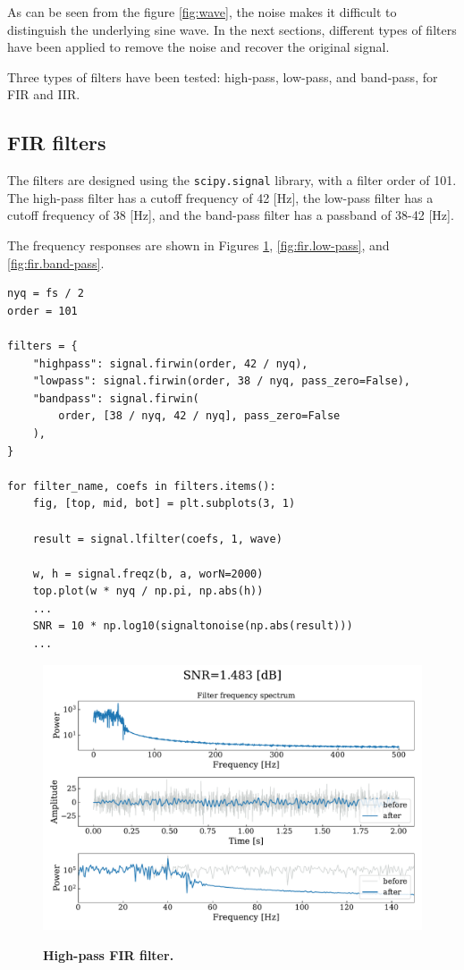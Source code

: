 \documentclass[13pt,a4paper]{article}
\begin{document}
As can be seen from the figure \ref{fig:wave}, the noise makes it difficult to distinguish the underlying sine wave. In the next sections, different types of filters have been applied to remove the noise and recover the original signal.

Three types of filters have been tested: high-pass, low-pass, and band-pass, for FIR and IIR.

\subsection{FIR filters}

The filters are designed using the \verb|scipy.signal| library, with a filter order of 101. The high-pass filter has a cutoff frequency of 42 [Hz], the low-pass filter has a cutoff frequency of 38 [Hz], and the band-pass filter has a passband of 38-42 [Hz].

The frequency responses are shown in Figures \ref{fig:fir.high-pass}, \ref{fig:fir.low-pass}, and \ref{fig:fir.band-pass}.

\begin{lstlisting}[caption={\textbf{Code snippet for applying the FIR filters.}}]
nyq = fs / 2
order = 101

filters = {
    "highpass": signal.firwin(order, 42 / nyq),
    "lowpass": signal.firwin(order, 38 / nyq, pass_zero=False),
    "bandpass": signal.firwin(
        order, [38 / nyq, 42 / nyq], pass_zero=False
    ),
}

for filter_name, coefs in filters.items():
    fig, [top, mid, bot] = plt.subplots(3, 1)

    result = signal.lfilter(coefs, 1, wave)

    w, h = signal.freqz(b, a, worN=2000)
    top.plot(w * nyq / np.pi, np.abs(h))
    ...
    SNR = 10 * np.log10(signaltonoise(np.abs(result)))
    ...
\end{lstlisting}

\begin{figure}[ht!]
    \centering
    \caption{\textbf{High-pass FIR filter.}}
    \includegraphics[width=0.9\linewidth]{fir.highpass.pdf}
    \label{fig:fir.high-pass}
\end{figure}
\end{document}
